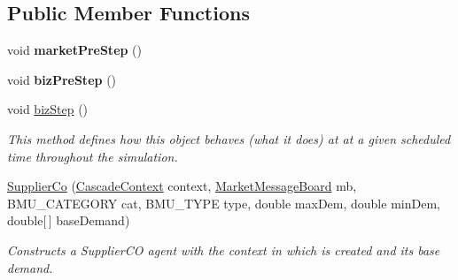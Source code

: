 \subsection*{Public Member Functions}
\begin{DoxyCompactItemize}
\item 
\hypertarget{classuk_1_1ac_1_1dmu_1_1iesd_1_1cascade_1_1agents_1_1aggregators_1_1_supplier_co_acb2659286d3861691337c00aab20661f}{void {\bfseries market\-Pre\-Step} ()}\label{classuk_1_1ac_1_1dmu_1_1iesd_1_1cascade_1_1agents_1_1aggregators_1_1_supplier_co_acb2659286d3861691337c00aab20661f}

\item 
\hypertarget{classuk_1_1ac_1_1dmu_1_1iesd_1_1cascade_1_1agents_1_1aggregators_1_1_supplier_co_ad01298b64b5708d6b7994300561d821c}{void {\bfseries biz\-Pre\-Step} ()}\label{classuk_1_1ac_1_1dmu_1_1iesd_1_1cascade_1_1agents_1_1aggregators_1_1_supplier_co_ad01298b64b5708d6b7994300561d821c}

\item 
\hypertarget{classuk_1_1ac_1_1dmu_1_1iesd_1_1cascade_1_1agents_1_1aggregators_1_1_supplier_co_a400211590ec0da8719a2b8f266a2ac30}{void \hyperlink{classuk_1_1ac_1_1dmu_1_1iesd_1_1cascade_1_1agents_1_1aggregators_1_1_supplier_co_a400211590ec0da8719a2b8f266a2ac30}{biz\-Step} ()}\label{classuk_1_1ac_1_1dmu_1_1iesd_1_1cascade_1_1agents_1_1aggregators_1_1_supplier_co_a400211590ec0da8719a2b8f266a2ac30}

\begin{DoxyCompactList}\small\item\em This method defines how this object behaves (what it does) at at a given scheduled time throughout the simulation. \end{DoxyCompactList}\item 
\hyperlink{classuk_1_1ac_1_1dmu_1_1iesd_1_1cascade_1_1agents_1_1aggregators_1_1_supplier_co_a4e1292d1cb0a415e57ada1c7b9881d06}{Supplier\-Co} (\hyperlink{classuk_1_1ac_1_1dmu_1_1iesd_1_1cascade_1_1context_1_1_cascade_context}{Cascade\-Context} context, \hyperlink{classuk_1_1ac_1_1dmu_1_1iesd_1_1cascade_1_1market_1_1astem_1_1operators_1_1_market_message_board}{Market\-Message\-Board} mb, B\-M\-U\-\_\-\-C\-A\-T\-E\-G\-O\-R\-Y cat, B\-M\-U\-\_\-\-T\-Y\-P\-E type, double max\-Dem, double min\-Dem, double\mbox{[}$\,$\mbox{]} base\-Demand)
\begin{DoxyCompactList}\small\item\em Constructs a Supplier\-C\-O agent with the context in which is created and its base demand. \end{DoxyCompactList}\end{DoxyCompactItemize}
